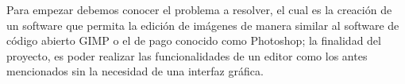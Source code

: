 Para empezar debemos conocer el problema a resolver, el cual es la creación de un
 software que permita la edición de imágenes de manera similar al software de código
  abierto GIMP o el de pago conocido como Photoshop; la finalidad del proyecto, es 
  poder realizar las funcionalidades de un editor como los antes mencionados sin la necesidad 
  de una interfaz gráfica.